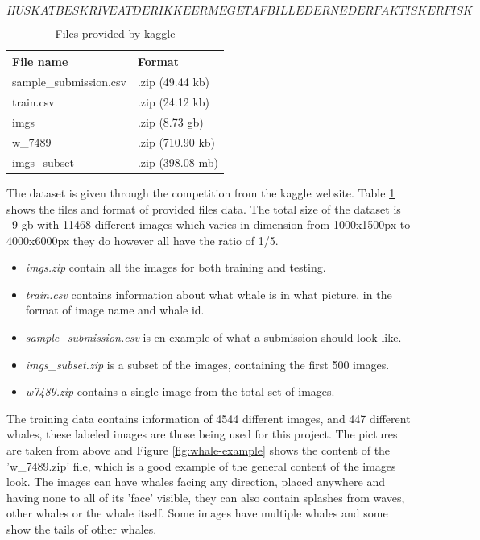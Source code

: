 \[HUSK AT BESKRIVE AT DER IKKE ER MEGET AF BILLEDERNE DER FAKTISK ER FISK\]
\begin{table}
	\centering
	\caption{Files provided by kaggle}
	\label{table:dataset-files}
	\begin{tabular}{|l|l|}
		\hline
		File name              & Format           \\ \hline \hline
		sample\_submission.csv & .zip (49.44 kb)  \\ \hline
		train.csv              & .zip (24.12 kb)  \\ \hline
		imgs                   & .zip (8.73 gb)   \\ \hline
		w\_7489                & .zip (710.90 kb) \\ \hline
		imgs\_subset           & .zip (398.08 mb) \\ \hline
	\end{tabular}
\end{table}

The dataset is given through the competition from the kaggle website. Table \ref{table:dataset-files} shows the files and format of provided files data. The total size of the dataset is ~9 gb with 11468 different images which varies in dimension from 1000x1500px to 4000x6000px they do however all have the ratio of 1/5.

\begin{itemize}
	\item \emph{imgs.zip} contain all the images for both training and testing.
	\item \emph{train.csv} contains information about what whale is in what picture, in the format of image name and whale id.
	\item \emph{sample\_submission.csv} is en example of what a submission should look like.
	\item \emph{imgs\_subset.zip} is a subset of the images, containing the first 500 images.
	\item \emph{w\-7489.zip} contains a single image from the total set of images.
\end{itemize}

The training data contains information of 4544 different images, and 447 different whales, these labeled images are those being used for this project. The pictures are taken from above and Figure \ref{fig:whale-example} shows the content of the 'w\_7489.zip' file, which is a good example of the general content of the images look. The images can have whales facing any direction, placed anywhere and having none to all of its 'face' visible, they can also contain splashes from waves, other whales or the whale itself. Some images have multiple whales and some show the tails of other whales.

